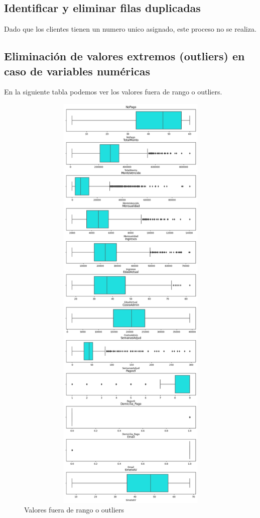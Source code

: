 \subsection{ Identificar y eliminar filas duplicadas}

Dado que los clientes tienen un numero unico asignado, este proceso no se realiza. \medskip
\subsection{ Eliminación de valores extremos (outliers) en caso de variables numéricas}

En la siguiente tabla podemos ver los valores fuera de rango o outliers. \medskip
\newpage
\begin{figure}[H]
    \centering
       \includegraphics[width=16cm, height=21cm ]{Imagenes/GraficaCajaYBigoteNumericas.png}
      \caption{Valores fuera de rango o outliers}
      \label{fig:Outliers}
\end{figure}

